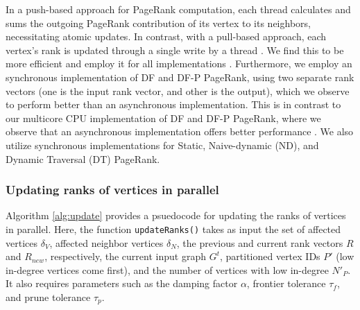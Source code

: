 In a push-based approach for PageRank computation, each thread calculates and sums the outgoing PageRank contribution of its vertex to its neighbors, necessitating atomic updates. In contrast, with a pull-based approach, each vertex's rank is updated through a single write by a thread \cite{verstraaten2015quantifying}. We find this to be more efficient and employ it for all implementations \cite{sahu2024df}. Furthermore, we employ an synchronous implementation of DF and DF-P PageRank, using two separate rank vectors (one is the input rank vector, and other is the output), which we observe to perform better than an asynchronous implementation. This is in contrast to our multicore CPU implementation of DF and DF-P PageRank, where we observe that an asynchronous implementation offers better performance \cite{sahu2024df, sahu2024incrementally}. We also utilize synchronous implementations for Static, Naive-dynamic (ND), and Dynamic Traversal (DT) PageRank.


\subsubsection{Updating ranks of vertices in parallel}

Algorithm \ref{alg:update} provides a psuedocode for updating the ranks of vertices in parallel. Here, the function \texttt{updateRanks()} takes as input the set of affected vertices $\delta_V$, affected neighbor vertices $\delta_N$, the previous and current rank vectors $R$ and $R_{new}$, respectively, the current input graph $G^t$, partitioned vertex IDs $P'$ (low in-degree vertices come first), and the number of vertices with low in-degree $N'_P$. It also requires parameters such as the damping factor $\alpha$, frontier tolerance $\tau_f$, and prune tolerance $\tau_p$.

